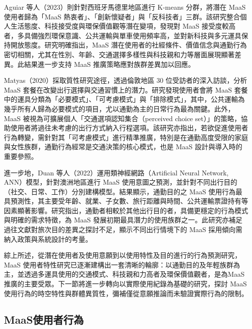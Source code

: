 Aguiar 等人（2023）則針對西班牙馬德里地區進行 K-means 分群，將潛在 MaaS
使用者歸為「MaaS
熱衷者」、「創新懷疑者」與「反科技者」三群。該研究整合個人生活態度、科技接受度與環保價值觀等潛在變項，發現對
MaaS
接受度較高者，多具備強烈環保意識、公共運輸與單車使用頻率高，並對新科技與多元運具保持開放態度。研究明確指出，MaaS
潛在使用者的社經條件、價值信念與通勤行為密切相關，尤其在性別、年齡、交通選擇多樣性與科技親和力等層面展現顯著差異。此結果進一步支持
MaaS 推廣策略應對族群差異加以回應。

Matyas（2020）採取質性研究途徑，透過倫敦地區 30 位受訪者的深入訪談，分析
MaaS 套餐在改變出行選擇與交通習慣上的潛力。研究發現使用者會將 MaaS
套餐中的運具分類為「必要模式」、「可考慮模式」與「排除模式」，其中，公共運輸為幾乎所有人歸為必要模式的項目，尤以通勤為主的日常行為最為關鍵。此外，MaaS
被視為可擴展個人「交通選項認知集合（perceived choice
set）」的策略，協助使用者將過往未考慮的出行方式納入行程選項。該研究亦指出，若欲促進使用者行為轉變，需針對其「可考慮模式」進行精準推廣，特別是在通勤高度受限的家庭與女性族群，通勤行為經常是交通決策的核心模式，也是
MaaS 設計與導入時的重要參照。

進一步地，Duan 等人（2022）運用類神經網路（Artificial Neural Network,
ANN）模型，針對澳洲地區進行 MaaS
使用意圖之預測，並針對不同出行目的（社交、日常、工作）分別建構模型。結果顯示，通勤目的之
MaaS
使用行為最具預測性，其主要受年齡、就業、子女數、旅行距離與時間、公共運輸票證持有等因素顯著影響。研究指出，通勤者相較於其他出行目的者，具備更穩定的行為模式與明確的需求特徵，為
MaaS
發展初期最具潛力的使用族群之一。此研究亦補足過往文獻對旅次目的差異之探討不足，顯示不同出行情境下的
MaaS 採用傾向需納入政策與系統設計的考量。

綜上所述，從潛在使用者及使用意願到以使用特性及目的進行的行為預測研究，MaaS
使用者特性研究已逐漸建構出一套清晰的輪廓：以通勤目的及年輕族群為主，並透過多運具使用的交通模式、科技親和力高者及環保價值觀者，是為MaaS推廣的主要受眾。下一節將進一步轉向以實際使用紀錄為基礎的研究，探討
MaaS
使用行為的時空特性與群體異質性，彌補僅從意願推論而未驗證實際行為的限制。

\subsection{MaaS使用者行為}\label{maasux4f7fux7528ux8005ux884cux70ba}
